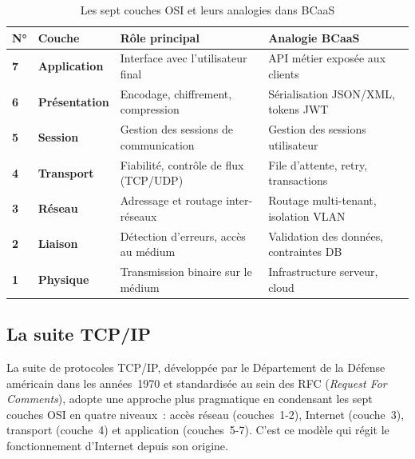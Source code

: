 \begin{table}[ht]
  \centering
  \caption{Les sept couches OSI et leurs analogies dans BCaaS}
  \label{tab:osi-bcaas}
  \renewcommand{\arraystretch}{1.3}
  \begin{tabularx}{\textwidth}{>{\centering\bfseries}p{1.2cm}
                               >{\bfseries}p{2.4cm}
                               >{\raggedright\arraybackslash}X
                               >{\raggedright\arraybackslash}X}
    \toprule
    \textbf{N°} & \textbf{Couche} & \textbf{Rôle principal} & \textbf{Analogie BCaaS} \\
    \midrule
    7 & Application   & Interface avec l'utilisateur final                    & API métier exposée aux clients \\
    6 & Présentation  & Encodage, chiffrement, compression                    & Sérialisation JSON/XML, tokens JWT \\
    5 & Session       & Gestion des sessions de communication                 & Gestion des sessions utilisateur \\
    4 & Transport     & Fiabilité, contrôle de flux (TCP/UDP)                 & File d'attente, retry, transactions \\
    3 & Réseau        & Adressage et routage inter-réseaux                    & Routage multi-tenant, isolation VLAN \\
    2 & Liaison       & Détection d'erreurs, accès au médium                  & Validation des données, contraintes DB \\
    1 & Physique      & Transmission binaire sur le médium                    & Infrastructure serveur, cloud \\
    \bottomrule
  \end{tabularx}
\end{table}

\subsection{La suite TCP/IP}
\label{subsec:tcpip}

La suite de protocoles TCP/IP, développée par le Département de la Défense américain dans
les années~1970 et standardisée au sein des RFC (\textit{Request For Comments}), adopte
une approche plus pragmatique en condensant les sept couches OSI en quatre niveaux~:
accès réseau (couches~1-2), Internet (couche~3), transport (couche~4) et application
(couches~5-7). C'est ce modèle qui régit le fonctionnement d'Internet depuis son origine.

